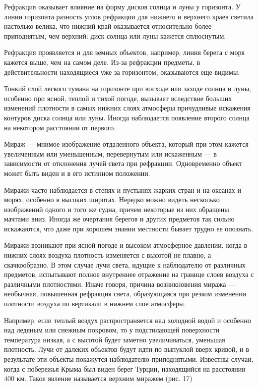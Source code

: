 Рефракция оказывает влияние на форму дисков солнца и луны у горизонта. У линии горизонта разность углов рефракции для нижнего и верхнего краев светила настолько велика, что нижний край оказывается относительно более приподнятым, чем верхний: диск солнца или луны кажется сплюснутым.

Рефракция проявляется и для земных объектов, например, линия берега с моря кажется выше, чем на самом деле. Из-за рефракции предметы, в действительности находящиеся уже за горизонтом, оказываются еще видимы.

Тонкий слой легкого тумана на горизонте при восходе или заходе солнца и луны, особенно при ясной, теплой и тихой погоде, вызывает вследствие больших изменений плотности в самых нижних слоях атмосферы причудливые искажения контуров диска солнца или луны. Иногда наблюдается появление второго солнца на некотором расстоянии от первого.

Мираж — мнимое изображение отдаленного объекта, который при этом кажется увеличенным или уменьшенным, перевернутым или искаженным — в зависимости от отклонения лучей света при рефракции. Одновременно объект может быть виден и в его истинном положении.

Миражи часто наблюдается в степях и пустынях жарких стран и на океанах и морях, особенно в высоких широтах. Нередко можно видеть несколько изображений одного и того же судна, причем некоторые из них обращены мачтами вниз. Иногда же очертания берегов и других предметов так сильно искажаются, что даже при хорошем знании местности бывает трудно ее опознать.

Миражи возникают при ясной погоде и высоком атмосферное давлении, когда в нижних слоях воздуха плотность изменяется с высотой не плавно, а скачкообразно. В этом случае лучи света, идущие к наблюдателю от различных предметов, испытывают полное внутреннее отражение на границе слоев воздуха с различными плотностями. Иначе говоря, причина возникновения миража — необычная, повышенная рефракция света, образующаяся при резком изменении плотности воздуха по вертикали в нижнем слое атмосферы.

Например, если теплый воздух распространяется над холодной водой и особенно над ледяным или снежным покровом, то у подстилающей поверхности температура низкая, а с высотой будет заметно увеличиваться, уменьшая плотность. Лучи от далеких объектов будут идти по выпуклой вверх кривой, и в результате эти объекты покажутся наблюдателю приподнятыми. Известны случаи, когда с побережья Крыма был виден берег Турции, находящийся на расстоянии 400 км. Такое явление называется верхним миражем (рис. 17)


